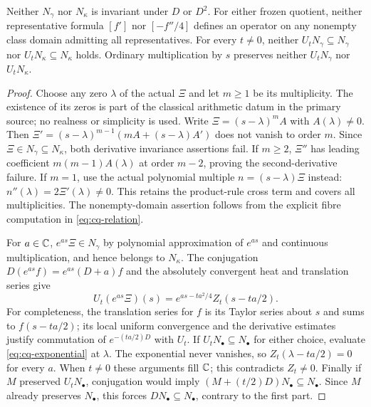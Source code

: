 \begin{cqtheorem}
\label{thm:cq-obstruction}
Neither $N_\gamma$ nor $N_\kappa$ is invariant under $D$ or $D^2$.
For either frozen quotient, neither representative formula $[f']$
nor $[-f''/4]$ defines an operator on any nonempty class domain
admitting all representatives.
For every $t\ne0$, neither $U_tN_\gamma\subseteq N_\gamma$ nor
$U_tN_\kappa\subseteq N_\kappa$ holds. Ordinary multiplication
by $s$ preserves neither $U_tN_\gamma$ nor $U_tN_\kappa$.
\end{cqtheorem}
\begin{proof}
Choose any zero $\lambda$ of the actual $\Xi$ and let $m\geq1$
be its multiplicity. The existence of its zeros is part of the
classical arithmetic datum in the primary source; no realness or
simplicity is used. Write $\Xi=(s-\lambda)^mA$ with
$A(\lambda)\ne0$. Then $\Xi'=(s-\lambda)^{m-1}
(mA+(s-\lambda)A')$ does not vanish to order $m$.
Since $\Xi\in N_\gamma\subseteq N_\kappa$, both derivative
invariance assertions fail. If $m\geq2$, $\Xi''$ has leading
coefficient $m(m-1)A(\lambda)$ at order $m-2$, proving the
second-derivative failure. If $m=1$, use the actual polynomial
multiple $n=(s-\lambda)\Xi$ instead: $n''(\lambda)=2\Xi'(\lambda)
\ne0$. This retains the product-rule cross term and covers all
multiplicities. The nonempty-domain assertion follows from the
explicit fibre computation in \eqref{eq:cq-relation}.

For $a\in\mathbb C$, $e^{as}\Xi\in N_\gamma$ by polynomial
approximation of $e^{as}$ and continuous multiplication, and hence
belongs to $N_\kappa$. The conjugation $D(e^{as}f)=e^{as}(D+a)f$
and the absolutely convergent heat and translation series give
\begin{equation}\label{eq:cq-exponential}
 U_t(e^{as}\Xi)(s)
    =e^{as-ta^2/4}Z_t(s-ta/2).
\end{equation}
For completeness, the translation series for $f$ is its Taylor
series about $s$ and sums to $f(s-ta/2)$; its local uniform
convergence and the derivative estimates justify commutation of
$e^{-(ta/2)D}$ with $U_t$. If $U_tN_\bullet\subseteq N_\bullet$
for either choice, evaluate \eqref{eq:cq-exponential} at $\lambda$.
The exponential never vanishes, so $Z_t(\lambda-ta/2)=0$ for
every $a$. When $t\ne0$ these arguments fill $\mathbb C$; this contradicts
$Z_t\ne0$. Finally if $M$ preserved $U_tN_\bullet$, conjugation
would imply $(M+(t/2)D)N_\bullet\subseteq N_\bullet$.
Since $M$ already preserves $N_\bullet$, this forces
$DN_\bullet\subseteq N_\bullet$, contrary to the first part.
\end{proof}

